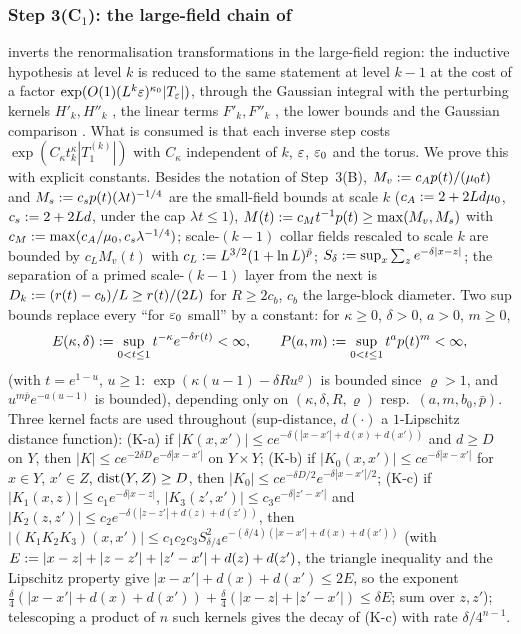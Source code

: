 
\subsubsection*{Step 3(C$_1$): the large-field chain of \cite[Sect.~3A]{Ba2}}

\cite[Sect.~3A]{Ba2} inverts the renormalisation transformations in the large-field region: the inductive hypothesis \cite[(3.5)]{Ba2} at level $k$ is reduced to the same statement at level $k-1$ at the cost of a factor $\exp(O(1)(L^k\varepsilon)^{\kappa_0}|T_{\varepsilon}|)$, through the Gaussian integral \cite[(3.9)]{Ba2} with the perturbing kernels $H'_k,H''_k$ \cite[(3.8), (3.12)]{Ba2}, the linear terms $F'_k,F''_k$ \cite[(3.10)]{Ba2}, the lower bounds \cite[(3.11)]{Ba2} and the Gaussian comparison \cite[(3.17)--(3.20)]{Ba2}. What is consumed is that each inverse step costs $\exp(C_\kappa t_k^\kappa|T^{(k)}_1|)$ with $C_\kappa$ independent of $k$, $\varepsilon$, $\varepsilon_0$ and the torus. We prove this with explicit constants. Besides the notation of Step~3(B), $M_v:= c_Ap(t)/(\mu_0 t)$ and $M_s:= c_sp(t)(\lambda t)^{-1/4}$ are the small-field bounds \cite[(2.16)--(2.17)]{Ba2} at scale $k$ ($c_A:=2+2Ld\mu_0$, $c_s:=2+2Ld$, under the cap $\lambda t\le1$), $M(t):= c_Mt^{-1}p(t)\ge\max(M_v,M_s)$ with $c_M:=\max(c_A/\mu_0,c_s\lambda^{-1/4})$; scale-$(k-1)$ collar fields rescaled to scale $k$ are bounded by $c_LM_v(t)$ with $c_L:= L^{3/2}(1+\ln L)^{\bar p}$; $S_\delta:=\sup_x\sum_ze^{-\delta|x-z|}$; the separation of a primed scale-$(k-1)$ layer from the next is $D_k:=(r(t)-c_b)/L\ge r(t)/(2L)$ for $R\ge2c_b$, $c_b$ the large-block diameter. Two sup bounds replace every ``for $\varepsilon_0$ small'' by a constant: for $\kappa\ge0$, $\delta>0$, $a>0$, $m\ge0$,
\[
E(\kappa,\delta):=\sup_{0<t\le1}t^{-\kappa}e^{-\delta r(t)}<\infty,\qquad P(a,m):=\sup_{0<t\le1}t^ap(t)^m<\infty,
\]
(with $t=e^{1-u}$, $u\ge1$: $\exp(\kappa(u-1)-\delta Ru^\varrho)$ is bounded since $\varrho>1$, and $u^{m\bar p}e^{-a(u-1)}$ is bounded), depending only on $(\kappa,\delta,R,\varrho)$ resp.\ $(a,m,b_0,\bar p)$. Three kernel facts are used throughout (sup-distance, $d(\cdot)$ a $1$-Lipschitz distance function): (K-a) if $|K(x,x')|\le ce^{-\delta(|x-x'|+d(x)+d(x'))}$ and $d\ge D$ on $Y$, then $|K|\le ce^{-2\delta D}e^{-\delta|x-x'|}$ on $Y\times Y$; (K-b) if $|K_0(x,x')|\le ce^{-\delta|x-x'|}$ for $x\in Y$, $x'\in Z$, $\operatorname{dist}(Y,Z)\ge D$, then $|K_0|\le ce^{-\delta D/2}e^{-\delta|x-x'|/2}$; (K-c) if $|K_1(x,z)|\le c_1e^{-\delta|x-z|}$, $|K_3(z',x')|\le c_3e^{-\delta|z'-x'|}$ and $|K_2(z,z')|\le c_2e^{-\delta(|z-z'|+d(z)+d(z'))}$, then $|(K_1K_2K_3)(x,x')|\le c_1c_2c_3S^2_{\delta/4}e^{-(\delta/4)(|x-x'|+d(x)+d(x'))}$ (with $E:=|x-z|+|z-z'|+|z'-x'|+d(z)+d(z')$, the triangle inequality and the Lipschitz property give $|x-x'|+d(x)+d(x')\le2E$, so the exponent $\frac{\delta}{4}(|x-x'|+d(x)+d(x'))+\frac\delta4(|x-z|+|z'-x'|)\le\delta E$; sum over $z,z'$); telescoping a product of $n$ such kernels gives the decay of (K-c) with rate $\delta/4^{n-1}$.

